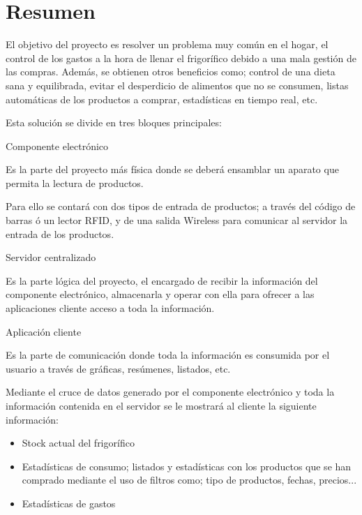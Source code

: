 \chapter*{Resumen}

El objetivo del proyecto es resolver un problema muy común en el hogar, el control de los gastos a la hora de llenar el frigorífico debido a una mala gestión de las compras. Además, se obtienen otros beneficios como; control de una dieta sana y equilibrada, evitar el desperdicio de alimentos que no se consumen, listas automáticas de los productos a comprar, estadísticas en tiempo real, etc.

Esta solución se divide en tres bloques principales:

 \begin{description}
    \item Componente electrónico

    Es la parte del proyecto más física donde se deberá ensamblar un aparato que permita la lectura de productos.

    Para ello se contará con dos tipos de entrada de productos; a través del código de barras ó un lector RFID, y de una salida Wireless para comunicar al servidor la entrada de los productos.

    \item Servidor centralizado

    Es la parte lógica del proyecto, el encargado de recibir la información del componente electrónico, almacenarla y operar con ella para ofrecer a las aplicaciones cliente acceso a toda la información.

    \item Aplicación cliente

    Es la parte de comunicación donde toda la información es consumida por el usuario a través de gráficas, resúmenes, listados, etc.

    Mediante el cruce de datos generado por el componente electrónico y toda la información contenida en el servidor se le mostrará al cliente la siguiente información:
        \begin{itemize}
        \item Stock actual del frigorífico
        \item Estadísticas de consumo; listados y estadísticas con los productos que se han comprado mediante el uso de filtros como; tipo de productos, fechas, precios...
        \item Estadísticas de gastos
        \end{itemize}


\end{description}
